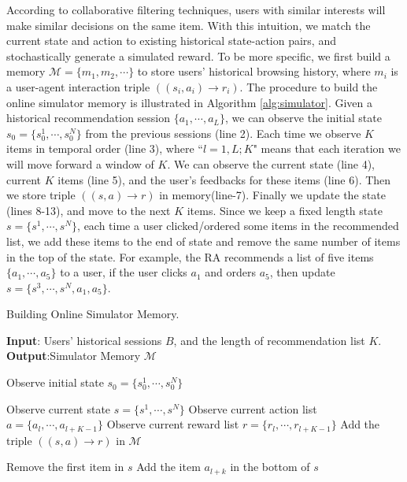 According to collaborative filtering techniques, users with similar interests will make similar decisions on the same item. With this intuition, we match the current state and action to existing historical state-action pairs, and stochastically generate a simulated reward. To be more specific, we first build a memory $\mathcal{M} = \{m_1, m_2, \cdots\}$ to store users' historical browsing history, where $m_i$ is a user-agent interaction triple $((s_i,a_i) \rightarrow r_i)$. The procedure to build the online simulator memory is illustrated in Algorithm \ref{alg:simulator}. Given a historical recommendation session $\{a_1, \cdots, a_L\}$, we can observe the initial state $s_0 = \{s_0^1, \cdots, s_0^N\}$ from the previous sessions (line 2). Each time we observe $K$ items in temporal order (line 3), where ``$l =1, L; K$" means that each iteration we will move forward a window of $K$. We can observe the current state (line 4), current $K$ items (line 5), and the user's feedbacks for these items (line 6). Then we store triple $((s,a)\rightarrow r)$ in memory(line-7). Finally we update the state (lines 8-13), and move to the next $K$ items. Since we keep a fixed length state $s = \{s^1, \cdots, s^N\}$, each time a user clicked/ordered some items in the recommended list, we add these items to the end of state and remove the same number of items in the top of the state. For example, the RA recommends a list of five items $\{a_{1}, \cdots, a_{5}\} $ to a user, if the user clicks $a_{1}$ and orders $a_{5}$, then update $s = \{s^{3}, \cdots, s^{N}, a_{1}, a_{5}\}$.

\begin{algorithm}
	\caption{\label{alg:simulator} Building Online Simulator Memory.}
	\raggedright
	{\bf Input}: Users' historical sessions $B$, and the length of recommendation list $K$.\\
	{\bf Output}:Simulator Memory $\mathcal{M}$\\
	\begin{algorithmic} [1]
		
			\STATE Observe initial state $s_0 = \{s_0^1, \cdots, s_0^N\}$
			
				\STATE Observe current state $s = \{s^1, \cdots, s^N\}$
				\STATE Observe current action list $a = \{a_{l}, \cdots, a_{l+K-1}\}$
				\STATE Observe current reward list  $r = \{r_{l}, \cdots, r_{l+K-1}\}$
				\STATE Add the triple $((s,a)\rightarrow r)$ in $\mathcal{M}$
				
				
						\STATE Remove the first item in $s$
						\STATE Add the item $a_{l+k}$ in the bottom of $s$
					\ENDIF
				\ENDFOR
			\ENDFOR
		\ENDFOR
		
	\end{algorithmic}
\end{algorithm}



